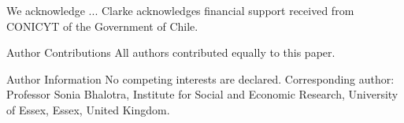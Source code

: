 \documentclass{nature}
\begin{document}
\begin{linenumbers}
\clearpage
\begin{addendum}
 \item We acknowledge ...  Clarke acknowledges financial support received from CONICYT of the Government of Chile.
 \item[Author Contributions] All authors contributed equally to this paper.
 \item[Author Information] No competing interests are declared.  Corresponding author: Professor Sonia Bhalotra, Institute for Social and Economic Research, University of Essex, Essex, United Kingdom.
\end{addendum}

\end{linenumbers}
\end{document}
